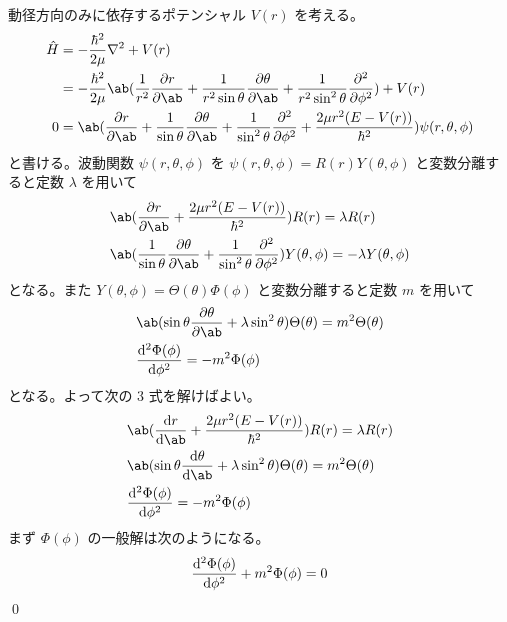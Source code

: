 \documentclass[uplatex,dvipdfmx,a4paper,11pt]{jlreq}
\makeatletter
\numberwithin{equation}{section}
\theoremstyle{definition}
\renewenvironment{proof}[1][\proofname]{\par
  \normalfont
  \topsep6\p@\@plus6\p@ \trivlist
  \item[\hskip\labelsep{\bfseries #1}\@addpunct{\bfseries}]\ignorespaces\quad\par
}{%
  \qed\endtrivlist\@endpefalse
}
\renewcommand\proofname{証明}
\makeatother
\begin{document}
\begin{proof}
  動径方向のみに依存するポテンシャル $V(r)$ を考える。
  \begin{align}
    \hat{H} & = -\frac{\hbar^2}{2\mu}\laplacian + V(r)                                                                                                                                                    \\
            & = -\frac{\hbar^2}{2\mu}\ab(\frac{1}{r^2}\pdv{r}\ab(r^2\pdv{r}) + \frac{1}{r^2\sin\theta}\pdv{\theta}\ab(\sin\theta\pdv{\theta}) + \frac{1}{r^2\sin^2\theta}\pdv[2]{\phi}) + V(r)            \\
    0       & = \ab(\pdv{r}\ab(r^2\pdv{r}) + \frac{1}{\sin\theta}\pdv{\theta}\ab(\sin\theta\pdv{\theta}) + \frac{1}{\sin^2\theta}\pdv[2]{\phi} + \frac{2\mu r^2(E - V(r))}{\hbar^2})\psi(r, \theta, \phi)
  \end{align}
  と書ける。波動関数 $\psi(r, \theta, \phi)$ を $\psi(r, \theta, \phi) = R(r)Y(\theta, \phi)$ と変数分離すると定数 $\lambda$ を用いて
  \begin{align}
     & \ab(\pdv{r}\ab(r^2\pdv{r}) + \frac{2\mu r^2(E - V(r))}{\hbar^2})R(r) = \lambda R(r)                                                               \\
     & \ab(\frac{1}{\sin\theta}\pdv{\theta}\ab(\sin\theta\pdv{\theta}) + \frac{1}{\sin^2\theta}\pdv[2]{\phi}) Y(\theta, \phi) = -\lambda Y(\theta, \phi)
  \end{align}
  となる。また $Y(\theta, \phi) = \Theta(\theta)\Phi(\phi)$ と変数分離すると定数 $m$ を用いて
  \begin{align}
     & \ab(\sin\theta\pdv{\theta}\ab(\sin\theta\pdv{\theta}) + \lambda \sin^2\theta)\Theta(\theta) = m^2\Theta(\theta) \\
     & \dv[2]{\Phi(\phi)}{\phi} = -m^2\Phi(\phi)
  \end{align}
  となる。よって次の 3 式を解けばよい。
  \begin{align}
     & \ab(\dv{r}\ab(r^2\dv{r}) + \frac{2\mu r^2(E - V(r))}{\hbar^2})R(r) = \lambda R(r)                              \\
     & \ab(\sin\theta\dv{\theta}\ab(\sin\theta\dv{\theta}) + \lambda \sin^2\theta)\Theta(\theta)  = m^2\Theta(\theta) \\
     & \dv[2]{\Phi(\phi)}{\phi} = -m^2\Phi(\phi)
  \end{align}
  まず $\Phi(\phi)$ の一般解は次のようになる。
  \begin{align}
     & \dv[2]{\Phi(\phi)}{\phi} + m^2\Phi(\phi) = 0               \\

\end{align}
\end{proof}
\end{document}

